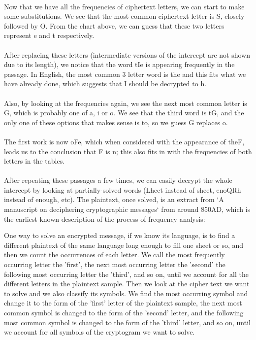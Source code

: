 \documentclass[Lau,binding=0.6cm,oneside]{sapthesis}
\begin{document}
\ \\
Now that we have all the frequencies of ciphertext letters, we can start to make some substitutions. We see that the most common ciphertext letter is \textsf{S}, closely followed by \textsf{O}. From the chart above, we can guess that these two letters represent \textsf{e} and \textsf{t} respectively.\\\\
After replacing these letters (intermediate versions of the intercept are not shown due to its length), we notice that the word \textsf{tIe} is appearing frequently in the passage. In English, the most common 3 letter word is \textsf{the} and this fits what we have already done, which suggests that \textsf{I} should be decrypted to \textsf{h}.\\\\
Also, by looking at the frequencies again, we see the next most common letter is \textsf{G}, which is probably one of \textsf{a}, \textsf{i} or \textsf{o}. We see that the third word is \textsf{tG}, and the only one of these options that makes sense is \textsf{to}, so we guess \textsf{G} replaces \textsf{o}.\\\\
The first work is now \textsf{oFe}, which when considered with the appearance of \textsf{theF}, leads us to the conclusion that \textsf{F} is \textsf{n}; this also fits in with the frequencies of both letters in the tables.\\\\
After repeating these passages a few times, we can easily decrypt the whole intercept by looking at partially-solved words (\textsf{Lheet} instead of \textsf{sheet}, \textsf{enoQRh} instead of \textsf{enough}, etc). The plaintext, once solved, is an extract from `A manuscript on deciphering cryptographic messages` from around 850AD, which is the earliest known description of the process of frequency analysis:\\

\begin{displayquote}\textsf{{\small
One way to solve an encrypted message, if we know its language, is to find a different plaintext of the same language long enough to fill one sheet or so, and then we count the occurrences of each letter. We call the most frequently occurring letter the 'first', the next most occurring letter the 'second' the following most occurring letter the 'third', and so on, until we account for all the different letters in the plaintext sample. Then we look at the cipher text we want to solve and we also classify its symbols. We find the most occurring symbol and change it to the form of the 'first' letter of the plaintext sample, the next most common symbol is changed to the form of the 'second' letter, and the following most common symbol is changed to the form of the 'third' letter, and so on, until we account for all symbols of the cryptogram we want to solve.
}}
\end{displayquote}
\ \\
\end{document}

